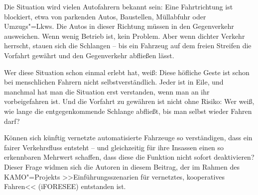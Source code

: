 \begin{figure}\vspace{-0.5cm}
\end{figure}


Die Situation wird vielen Autofahrern bekannt sein: Eine Fahrtrichtung ist blockiert, etwa von parkenden Autos, Baustellen, Müllabfuhr oder Umzugs"=Lkws. Die Autos in dieser Richtung müssen in den Gegenverkehr ausweichen. Wenn wenig Betrieb ist, kein Problem. Aber wenn dichter Verkehr herrscht, stauen sich die Schlangen -- bis ein Fahrzeug auf dem freien Streifen die Vorfahrt gewährt und den Gegenverkehr abfließen lässt.

Wer diese Situation schon einmal erlebt hat, weiß: Diese höfliche Geste ist schon bei menschlichen Fahrern nicht selbstverständlich. Jeder ist in Eile, und manchmal hat man die Situation erst verstanden, wenn man an ihr vorbeigefahren ist. Und die Vorfahrt zu gewähren ist nicht ohne Risiko: Wer weiß, wie lange die entgegenkommende Schlange abfließt, bis man selbst wieder Fahren darf?


Können sich künftig vernetzte automatisierte Fahrzeuge so verständigen, dass ein fairer Verkehrsfluss entsteht -- und gleichzeitig für ihre Insassen einen so erkennbaren Mehrwert schaffen, dass diese die Funktion nicht sofort deaktivieren? Dieser Frage widmen sich die Autoren in diesem Beitrag, der im Rahmen des KAMO"=Projekts >>Einführungsszenarien für vernetztes, kooperatives Fahren<< (iFORESEE) entstanden ist.

